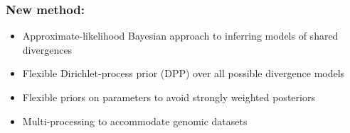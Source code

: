 \begin{frame}
    \frametitle{New method: \dppmsbayes}
    \begin{itemize}[<+->]
        \item Approximate-likelihood Bayesian approach to inferring models of
            shared divergences
        \item Flexible Dirichlet-process prior (DPP) over all possible
            divergence models
        \item Flexible priors on parameters to avoid strongly weighted
            posteriors
        \item Multi-processing to accommodate genomic datasets
    \end{itemize}
\end{frame}

